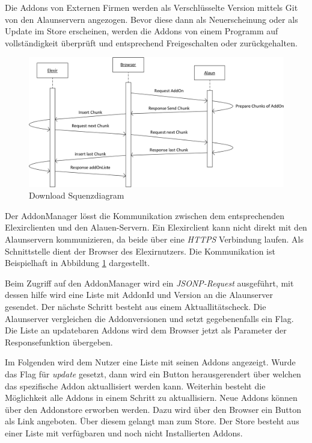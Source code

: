 \documentclass[12pt]{article}
\begin{document}
Die Addons von Externen Firmen werden als Verschlüsselte Version mittels Git von den Alaunservern angezogen. Bevor diese dann als Neuerscheinung
oder als Update im Store erscheinen, werden die Addons von einem Programm auf vollständigkeit überprüft und entsprechend Freigeschalten oder
zurückgehalten. 

\begin{figure}[h]
	\centering
	\includegraphics[width=1.0\textwidth]{Manager.png}
	\caption{Download Squenzdiagram}
	\label{fig:Manager}
\end{figure}


Der AddonManager lösst die Kommunikation zwischen dem entsprechenden Elexirclienten und den Alauen-Servern. Ein Elexirclient kann nicht direkt
mit den Alaunservern kommunizieren, da beide über eine \textit{HTTPS} Verbindung laufen. Als Schnittstelle dient der Browser des Elexirnutzers.
Die Kommunikation ist Beispielhaft in Abbildung \ref{fig:Manager} dargestellt. 

Beim Zugriff auf den AddonManager wird ein \textit{JSONP-Request} ausgeführt, mit dessen hilfe wird eine Liste mit AddonId und Version an die
Alaunserver gesendet. Der nächste Schritt besteht aus einem Aktuallitätscheck. Die Alaunserver vergleichen die Addonversionen und setzt gegebenenfalls
ein Flag. Die Liste an updatebaren Addons wird dem Browser jetzt als Parameter der Responsefunktion übergeben.

Im Folgenden wird dem Nutzer eine Liste mit seinen Addons angezeigt. Wurde das Flag für \textit{update} gesetzt, dann wird ein Button herausgerendert
über welchen das spezifische Addon aktuallisiert werden kann. Weiterhin besteht die Möglichkeit alle Addons in einem Schritt zu aktuallisiern.
Neue Addons können über den Addonstore erworben werden. Dazu wird über den Browser ein Button als Link angeboten. Über diesem gelangt man zum Store.
Der Store besteht aus einer Liste mit verfügbaren und noch nicht Installierten Addons. 
\end{document}
